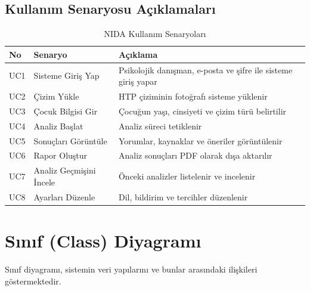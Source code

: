 \subsection{Kullanım Senaryosu Açıklamaları}

\begin{table}[H]
\centering
\caption{NIDA Kullanım Senaryoları}
\label{tab:usecases}
\begin{tabular}{p{1cm}p{4cm}p{8cm}}
\toprule
\textbf{No} & \textbf{Senaryo} & \textbf{Açıklama} \\
\midrule
UC1 & Sisteme Giriş Yap & Psikolojik danışman, e-posta ve şifre ile sisteme giriş yapar \\
UC2 & Çizim Yükle & HTP çiziminin fotoğrafı sisteme yüklenir \\
UC3 & Çocuk Bilgisi Gir & Çocuğun yaşı, cinsiyeti ve çizim türü belirtilir \\
UC4 & Analiz Başlat & Analiz süreci tetiklenir \\
UC5 & Sonuçları Görüntüle & Yorumlar, kaynaklar ve öneriler görüntülenir \\
UC6 & Rapor Oluştur & Analiz sonuçları PDF olarak dışa aktarılır \\
UC7 & Analiz Geçmişini İncele & Önceki analizler listelenir ve incelenir \\
UC8 & Ayarları Düzenle & Dil, bildirim ve tercihler düzenlenir \\
\bottomrule
\end{tabular}
\end{table}

\section{Sınıf (Class) Diyagramı}

Sınıf diyagramı, sistemin veri yapılarını ve bunlar arasındaki ilişkileri göstermektedir.

